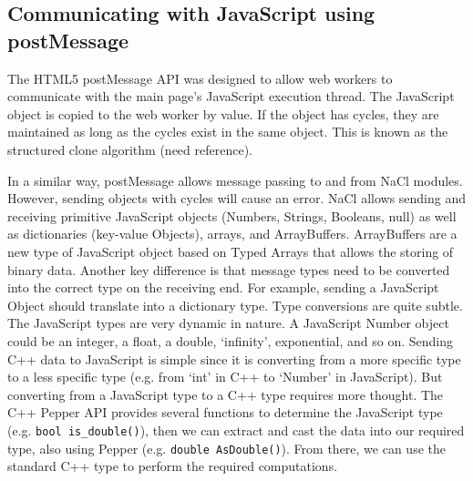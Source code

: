 \subsection{Communicating with JavaScript using postMessage}
The HTML5 postMessage API was designed to allow web workers to communicate with the main page's JavaScript execution thread. The JavaScript object is copied to the web worker by value. If the object has cycles, they are maintained as long as the cycles exist in the same object. This is known as the structured clone algorithm (need reference). 

In a similar way, postMessage allows message passing to and from NaCl modules. However, sending objects with cycles will cause an error. NaCl allows sending and receiving primitive JavaScript objects (Numbers, Strings, Booleans, null) as well as dictionaries (key-value Objects), arrays, and ArrayBuffers. ArrayBuffers are a new type of JavaScript object based on Typed Arrays \cite{typedarraysw3c} that allows the storing of binary data. Another key difference is that message types need to be converted into the correct type on the receiving end. For example, sending a JavaScript Object should translate into a dictionary type. Type conversions are quite subtle. The JavaScript types are very dynamic in nature. A JavaScript Number object could be an integer, a float, a double, `infinity', exponential, and so on. Sending C++ data to JavaScript is simple since it is converting from a more specific type to a less specific type (e.g. from `int' in C++ to `Number' in JavaScript). But converting from a JavaScript type to a C++ type requires more thought. The C++ Pepper API provides several functions to determine the JavaScript type (e.g. \verb+bool is_double()+), then we can extract and cast the data into our required type, also using Pepper (e.g. \verb+double AsDouble()+). From there, we can use the standard C++ type to perform the required computations.
